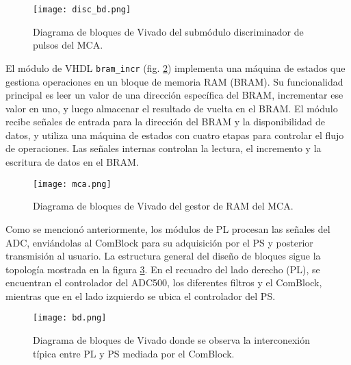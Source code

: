 \documentclass{report}
\begin{document}
\begin{figure}[H]
    \centering
    \texttt{[image: disc\_bd.png]}
    \caption{Diagrama de bloques de Vivado del submódulo discriminador de pulsos del MCA.}
    \label{fig:disc_bd}
\end{figure}

\noindent El módulo de VHDL \texttt{bram\_incr} (fig. \ref{fig:mca_bd}) implementa una máquina de estados que gestiona operaciones en un bloque de memoria RAM (BRAM). Su funcionalidad principal es leer un valor de una dirección específica del BRAM, incrementar ese valor en uno, y luego almacenar el resultado de vuelta en el BRAM. El módulo recibe señales de entrada para la dirección del BRAM y la disponibilidad de datos, y utiliza una máquina de estados con cuatro etapas para controlar el flujo de operaciones. Las señales internas controlan la lectura, el incremento y la escritura de datos en el BRAM.\\

\begin{figure}[H]
    \centering
    \texttt{[image: mca.png]}
    \caption{Diagrama de bloques de Vivado del gestor de RAM del MCA.}
    \label{fig:mca_bd}
\end{figure}

\noindent Como se mencionó anteriormente, los módulos de PL procesan las señales del ADC, enviándolas al ComBlock para su adquisición por el PS y posterior transmisión al usuario. La estructura general del diseño de bloques sigue la topología mostrada en la figura \ref{fig:bd}. En el recuadro del lado derecho (PL), se encuentran el controlador del ADC500, los diferentes filtros y el ComBlock, mientras que en el lado izquierdo se ubica el controlador del PS.

\begin{figure}[H]
    \centering
    \texttt{[image: bd.png]}
    \caption{Diagrama de bloques de Vivado donde se observa la interconexión típica entre PL y PS mediada por el ComBlock.}
    \label{fig:bd}
\end{figure}
\end{document}
